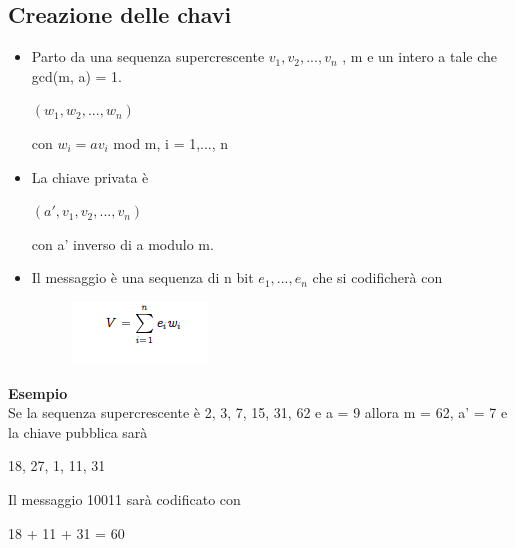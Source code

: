 \subsection{Creazione delle chavi}
\begin{itemize}
    \item Parto da una sequenza supercrescente $v_1, v_2, ... ,v_n$ , m e un intero a tale che gcd(m, a) = 1.
    
        \begin{center}
            $(w_1,w_2,...,w_n)$
        
        con $w_i = av_i$ mod m, i = 1,..., n
        \end{center}
        
    \item La chiave privata è 
        \begin{center}
            $(a', v_1, v_2,..., v_n )$
        \end{center}
    con a' inverso di a modulo m.
    
    \item Il messaggio è una sequenza di n bit $e_1,...,e_n$ che si codificherà con
    \begin{figure}[htp]
        \centering
        \includegraphics[scale=0.9]{tesi_stile/img/foto6cap14.png}
    \end{figure}
\end{itemize}
\textbf{Esempio}\\
Se la sequenza supercrescente è 2, 3, 7, 15, 31, 62 e a = 9 allora m = 62, a' = 7 e la chiave pubblica sarà
\begin{center}
    18, 27, 1, 11, 31
\end{center}
Il messaggio 10011 sarà codificato con
\begin{center}
    18 + 11 + 31 = 60
\end{center}
\newpage
